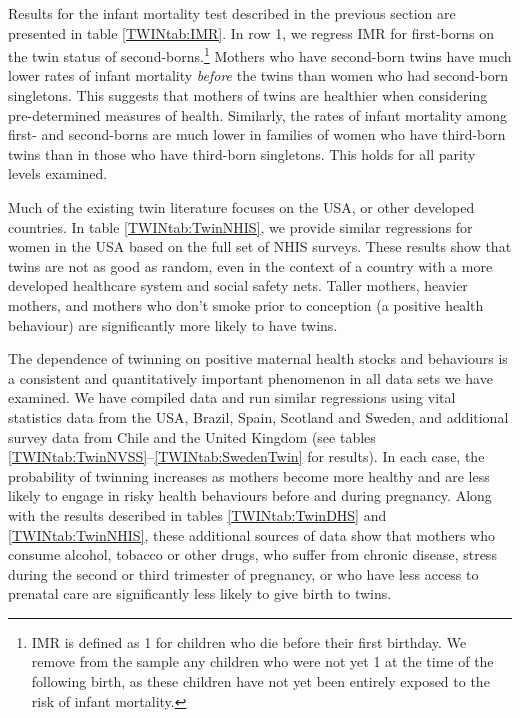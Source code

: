 \documentclass[subeqn]{article}
\begin{document}
\begin{spacing}{1.4}
Results for the infant mortality test described in the previous section are
presented in table \ref{TWINtab:IMR}.  In row 1, we regress IMR for first-borns
on the twin status of second-borns.\footnote{IMR is defined as 1 for children
who die before their first birthday.  We remove from the sample any children who
were not yet 1 at the time of the following birth, as these children have not
yet been entirely exposed to the risk of infant mortality.}  Mothers who have 
second-born twins have much lower rates of infant mortality \emph{before} the 
twins than women who had second-born singletons.  This suggests that mothers of 
twins are healthier when considering pre-determined measures of health.  
Similarly, the rates of infant mortality among first- and second-borns are much 
lower in families of women who have third-born twins than in those who have 
third-born singletons.  This holds for all parity levels examined.

Much of the existing twin literature focuses on the USA, or other developed
countries. In table \ref{TWINtab:TwinNHIS}, we provide similar regressions for 
women in the USA based on the full set of NHIS surveys.  These results show
that twins are not as good as random, even in the context of a country with 
a more developed healthcare system and social safety nets. Taller mothers,
heavier mothers, and mothers who don't smoke prior to conception (a positive
health behaviour) are significantly more likely to have twins.

The dependence of twinning on positive maternal health stocks and behaviours is
a consistent and quantitatively important phenomenon in all data sets we have
examined.  We have compiled data and run similar regressions using vital 
statistics data from the USA, Brazil, Spain, Scotland and Sweden, and 
additional survey data from Chile and the United Kingdom (see tables 
\ref{TWINtab:TwinNVSS}--\ref{TWINtab:SwedenTwin} for results).  In each case,
the probability of twinning increases as mothers become more healthy and are
less likely to engage in risky health behaviours before and during pregnancy.
Along with the results described in tables \ref{TWINtab:TwinDHS} and 
\ref{TWINtab:TwinNHIS}, these additional sources of data show that mothers
who consume alcohol, tobacco or other drugs, who suffer from chronic disease,
stress during the second or third trimester of pregnancy, or who have less 
access to prenatal care are significantly less likely to give birth to twins.


\end{spacing}
\end{document}
